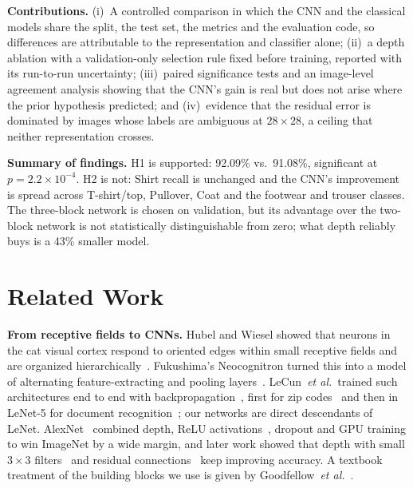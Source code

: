 \documentclass[conference]{IEEEtran}
\begin{document}
\textbf{Contributions.}
(i)~A controlled comparison in which the CNN and the classical models share the split, the test set, the metrics and
the evaluation code, so differences are attributable to the representation and classifier alone;
(ii)~a depth ablation with a validation-only selection rule fixed before training, reported with its run-to-run
uncertainty;
(iii)~paired significance tests and an image-level agreement analysis showing that the CNN's gain is real but does not
arise where the prior hypothesis predicted; and
(iv)~evidence that the residual error is dominated by images whose labels are ambiguous at $28\times28$, a ceiling that
neither representation crosses.

\textbf{Summary of findings.} H1 is supported: 92.09\% vs.\ 91.08\%, significant at $p=2.2\times10^{-4}$. H2 is
not: Shirt recall is unchanged and the CNN's improvement is spread across T-shirt/top, Pullover, Coat and the footwear and
trouser classes. The three-block network is chosen on validation, but its advantage over the two-block network is not
statistically distinguishable from zero; what depth reliably buys is a 43\% smaller model.

\section{Related Work}
\label{sec:related}
\textbf{From receptive fields to CNNs.} Hubel and Wiesel showed that neurons in the cat visual cortex respond to
oriented edges within small receptive fields and are organized hierarchically~\cite{hubel1962receptive}. Fukushima's
Neocognitron turned this into a model of alternating feature-extracting and pooling layers~\cite{fukushima1980neocognitron}.
LeCun~\emph{et al.}\ trained such architectures end to end with backpropagation~\cite{rumelhart1986learning}, first for
zip codes~\cite{lecun1989backpropagation} and then in LeNet-5 for document recognition~\cite{lecun1998gradient}; our
networks are direct descendants of LeNet. AlexNet~\cite{krizhevsky2012imagenet} combined depth, ReLU
activations~\cite{nair2010rectified}, dropout and GPU training to win ImageNet by a wide margin, and later work showed that
depth with small $3\times3$ filters~\cite{simonyan2015very} and residual connections~\cite{he2016deep} keep improving
accuracy. A textbook treatment of the building blocks we use is given by Goodfellow~\emph{et al.}~\cite{goodfellow2016deep}.
\end{document}
